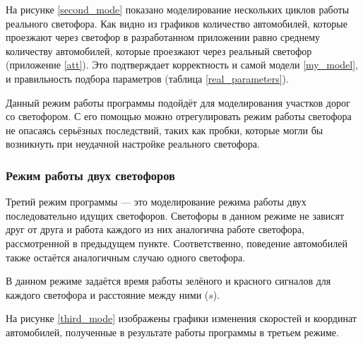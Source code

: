 \documentclass[12pt, a4paper]{extarticle}
\numberwithin{equation}{section}
\numberwithin{figure}{section}
\begin{document}
На рисунке \ref{second_mode} показано моделирование нескольких циклов работы реального светофора. Как видно из графиков количество автомобилей, которые проезжают через светофор в разработанном приложении равно среднему количеству автомобилей, которые проезжают через реальный светофор (приложение \ref{att}). Это подтверждает корректность и самой модели \eqref{my_model}, и правильность подбора параметров (таблица \ref{real_parameters}). 

Данный режим работы программы подойдёт для моделирования участков дорог со светофором. С его помощью можно отрегулировать режим работы светофора не опасаясь серьёзных последствий, таких как пробки, которые могли бы возникнуть при неудачной настройке реального светофора.  

\subsubsection{Режим работы двух светофоров}

Третий режим программы --- это моделирование режима работы двух последовательно идущих светофоров. Светофоры в данном режиме не зависят друг от друга и работа каждого из них аналогична работе светофора, рассмотренной в предыдущем пункте. Соответственно, поведение автомобилей также остаётся аналогичным случаю одного светофора.

В данном режиме задаётся время работы зелёного и красного сигналов для каждого светофора и расстояние между ними ($s$). 

На рисунке \ref{third_mode} изображены графики изменения скоростей и координат автомобилей, полученные в результате работы программы в третьем режиме.
\end{document}
